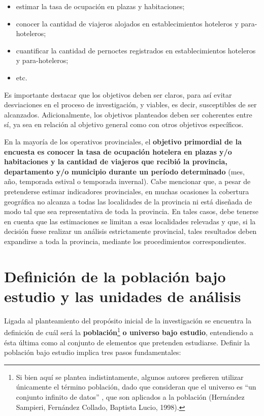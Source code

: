 \documentclass[
]{book}
\begin{document}
\begin{itemize}
\item
  estimar la tasa de ocupación en plazas y habitaciones;
\item
  conocer la cantidad de viajeros alojados en establecimientos hoteleros y para-hoteleros;
\item
  cuantificar la cantidad de pernoctes registrados en establecimientos hoteleros y para-hoteleros;
\item
  etc.
\end{itemize}

Es importante destacar que los objetivos deben ser claros, para así evitar desviaciones en el proceso de investigación, y viables, es decir, susceptibles de ser alcanzados. Adicionalmente, los objetivos planteados deben ser coherentes entre sí, ya sea en relación al objetivo general como con otros objetivos específicos.

En la mayoría de los operativos provinciales, el \textbf{objetivo primordial de la encuesta es conocer la tasa de ocupación hotelera en plazas y/o habitaciones y la cantidad de viajeros que recibió la provincia, departamento y/o municipio durante un período determinado} (mes, año, temporada estival o temporada invernal). Cabe mencionar que, a pesar de pretenderse estimar indicadores provinciales, en muchas ocasiones la cobertura geográfica no alcanza a todas las localidades de la provincia ni está diseñada de modo tal que sea representativa de toda la provincia. En tales casos, debe tenerse en cuenta que las estimaciones se limitan a esas localidades relevadas y que, si la decisión fuese realizar un análisis estrictamente provincial, tales resultados deben expandirse a toda la provincia, mediante los procedimientos correspondientes.

\hypertarget{definiciuxf3n-de-la-poblaciuxf3n-bajo-estudio-y-las-unidades-de-anuxe1lisis}{%
\section{Definición de la población bajo estudio y las unidades de análisis}\label{definiciuxf3n-de-la-poblaciuxf3n-bajo-estudio-y-las-unidades-de-anuxe1lisis}}

Ligada al planteamiento del propósito inicial de la investigación se encuentra la definición de cuál será la \textbf{población}\footnote{Si bien aquí se plantea indistintamente, algunos autores prefieren utilizar únicamente el término población, dado que consideran que el universo es ``un conjunto infinito de datos'' , que son aplicados a la población (Hernández Sampieri, Fernández Collado, Baptista Lucio, 1998).} \textbf{o universo bajo estudio}, entendiendo a ésta última como al conjunto de elementos que pretenden estudiarse. Definir la población bajo estudio implica tres pasos fundamentales:
\end{document}
